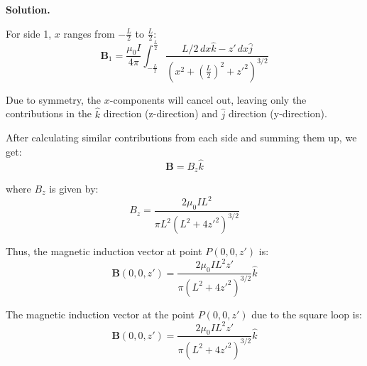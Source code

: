 \documentclass[12pt, a4paper, oneside]{report}
\newenvironment{solution}{
  \par\medskip\noindent
  \textbf{Solution.}\quad\itshape
  \par\noindent\makebox[\linewidth]{\rule{\textwidth}{0.4pt}}
}{
  \par\noindent\makebox[\linewidth]{\rule{\textwidth}{0.4pt}}
  \par\medskip
}
\begin{document}
\begin{solution}
For side 1, \(x\) ranges from \(-\frac{L}{2}\) to \(\frac{L}{2}\):
\[
\mathbf{B}_1 = \frac{\mu_0 I}{4\pi} \int_{-\frac{L}{2}}^{\frac{L}{2}} \frac{L/2 \, dx \hat{k} - z' \, dx \hat{j}}{(x^2 + (\frac{L}{2})^2 + z'^2)^{3/2}}
\]

Due to symmetry, the \(x\)-components will cancel out, leaving only the contributions in the \(\hat{k}\) direction (z-direction) and \(\hat{j}\) direction (y-direction).

After calculating similar contributions from each side and summing them up, we get:
\[
\mathbf{B} = B_z \hat{k}
\]

where \(B_z\) is given by:
\[
B_z = \frac{2 \mu_0 I L^2}{\pi L^2 (L^2 + 4z'^2)^{3/2}}
\]

Thus, the magnetic induction vector at point \(P(0,0,z')\) is:
\[
\mathbf{B}(0,0,z') = \frac{2 \mu_0 I L^2 z'}{\pi (L^2 + 4z'^2)^{3/2}} \hat{k}
\]

The magnetic induction vector at the point \(P(0,0,z')\) due to the square loop is:
\[
\boxed{\mathbf{B}(0,0,z') = \frac{2 \mu_0 I L^2 z'}{\pi (L^2 + 4z'^2)^{3/2}} \hat{k}}
\]

\end{solution}
\end{document}
